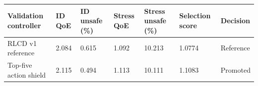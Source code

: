 \begin{tabular}{lllllll}
\toprule
Validation controller & ID QoE & ID unsafe (\%) & Stress QoE & Stress unsafe (\%) & Selection score & Decision \\
\midrule
RLCD v1 reference & 2.084 & 0.615 & 1.092 & 10.213 & 1.0774 & Reference \\
Top-five action shield & 2.115 & 0.494 & 1.113 & 10.111 & 1.1083 & Promoted \\
\bottomrule
\end{tabular}
